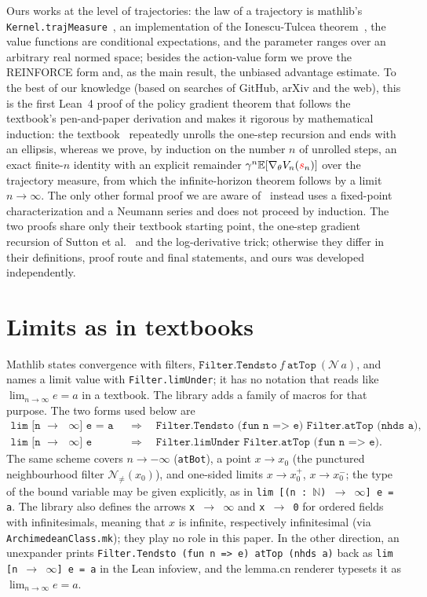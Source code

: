 \documentclass[11pt,a4paper]{article}
\newcommand{\E}{\mathbb{E}}
\newcommand{\rv}[1]{{\color{red}#1}}       %
\newcommand{\sv}{\rv{s}}
\newcommand{\grad}{\nabla_{\theta}}
\begin{document}
Ours works at the level of trajectories: the law of a trajectory is mathlib's \texttt{Kernel.trajMeasure}~\cite{mathlib}, an implementation of the Ionescu-Tulcea theorem~\cite{kallenberg2002foundations}, the value functions are conditional expectations, and the parameter ranges over an arbitrary real normed space; besides the action-value form we prove the REINFORCE form and, as the main result, the unbiased advantage estimate.
To the best of our knowledge (based on searches of GitHub, arXiv and the web), this is the first Lean~4 proof of the policy gradient theorem that follows the textbook's pen-and-paper derivation and makes it rigorous by mathematical induction: the textbook~\cite[\S13.2]{sutton2018reinforcement} repeatedly unrolls the one-step recursion and ends with an ellipsis, whereas we prove, by induction on the number $n$ of unrolled steps, an exact finite-$n$ identity with an explicit remainder $\gamma^n\E[\grad V_n(\sv_n)]$ over the trajectory measure, from which the infinite-horizon theorem follows by a limit $n\to\infty$.
The only other formal proof we are aware of~\cite{zhang2026pg} instead uses a fixed-point characterization and a Neumann series and does not proceed by induction.
The two proofs share only their textbook starting point, the one-step gradient recursion of Sutton et al.~\cite{sutton2000policy} and the log-derivative trick; otherwise they differ in their definitions, proof route and final statements, and ours was developed independently.

\section{Limits as in textbooks}
\label{sec:lim}

Mathlib states convergence with filters, $\mathtt{Filter.Tendsto}\ f\ \mathtt{atTop}\ (\mathcal N\,a)$, and names a limit value with \texttt{Filter.limUnder}; it has no notation that reads like $\lim_{n\to\infty}e=a$ in a textbook.
The library adds a family of macros for that purpose.
The two forms used below are
\begin{align*}
\texttt{lim [n $\to$ $\infty$] e = a}\quad&\Longrightarrow\quad\texttt{Filter.Tendsto (fun n => e) Filter.atTop (nhds a)},\\
\texttt{lim [n $\to$ $\infty$] e}\quad&\Longrightarrow\quad\texttt{Filter.limUnder Filter.atTop (fun n => e)}.
\end{align*}
The same scheme covers $n\to-\infty$ (\texttt{atBot}), a point $x\to x_0$ (the punctured neighbourhood filter $\mathcal N_{\ne}(x_0)$), and one-sided limits $x\to x_0^{+}$, $x\to x_0^{-}$; the type of the bound variable may be given explicitly, as in \texttt{lim [(n : $\mathbb N$) $\to$ $\infty$] e = a}.
The library also defines the arrows \texttt{x $\to$ $\infty$} and \texttt{x $\to$ 0} for ordered fields with infinitesimals, meaning that $x$ is infinite, respectively infinitesimal (via \texttt{ArchimedeanClass.mk}); they play no role in this paper.
In the other direction, an unexpander prints \texttt{Filter.Tendsto (fun n => e) atTop (nhds a)} back as \texttt{lim [n $\to$ $\infty$] e = a} in the Lean infoview, and the lemma.cn renderer typesets it as $\lim_{n\to\infty}e=a$.
\end{document}
